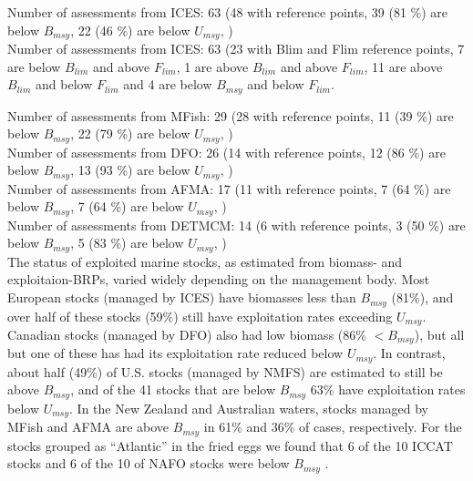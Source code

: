 Number of assessments from ICES: 63 (48 with reference points, 39 (81 \%) are below $B_{msy}$, 22 (46 \%) are below $U_{msy}$, ) \\

Number of assessments from ICES: 63 (23 with Blim and Flim reference points, 7 are below $B_{lim}$ and above $F_{lim}$, 1 are above $B_{lim}$ and above $F_{lim}$, 11 are above $B_{lim}$ and below $F_{lim}$ and 4 are below $B_{msy}$ and below $F_{lim}$.

Number of assessments from MFish: 29 (28 with reference points, 11 (39 \%) are below $B_{msy}$, 22 (79 \%) are below $U_{msy}$, ) \\
Number of assessments from DFO: 26 (14 with reference points, 12 (86 \%) are below $B_{msy}$, 13 (93 \%) are below $U_{msy}$, ) \\
Number of assessments from AFMA: 17 (11 with reference points, 7 (64 \%) are below $B_{msy}$, 7 (64 \%) are below $U_{msy}$, ) \\
Number of assessments from DETMCM: 14 (6 with reference points, 3 (50 \%) are below $B_{msy}$, 5 (83 \%) are below $U_{msy}$, ) \\

The status of exploited marine stocks, as estimated from biomass- and
exploitaion-BRPs, varied widely depending on the management body. Most European stocks (managed by
ICES) have biomasses less than $B_{msy}$
(81\%), and over half of these
stocks (59\%) still
have exploitation rates exceeding $U_{msy}$. Canadian stocks (managed
by DFO) also had low biomass (86\%
$< B_{msy}$), but all but one of these has had its exploitation rate
reduced below $U_{msy}$. In contrast, about half
(49\%) of U.S. stocks (managed by
NMFS) are estimated to still be above $B_{msy}$, and of the
41 stocks that are below $B_{msy}$
63\% have exploitation
rates below $U_{msy}$. In the New
Zealand and Australian waters, stocks managed by MFish and AFMA are
above $B_{msy}$ in 61\% and
36\% of cases, respectively. For
the stocks grouped as ``Atlantic'' in the fried eggs we
found that 6 of the
10 ICCAT stocks and
6 of the
10 of NAFO stocks were below $B_{msy}$ .



